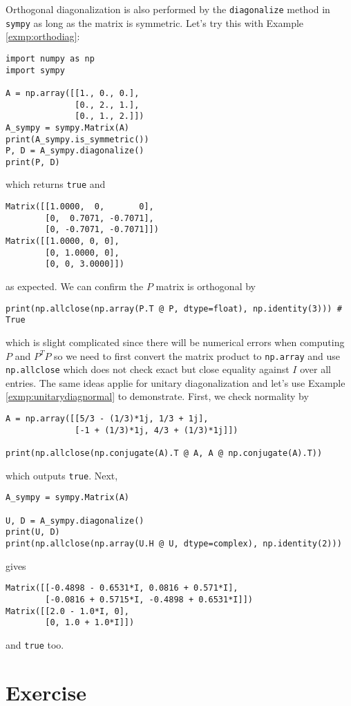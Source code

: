 Orthogonal diagonalization is also performed by the \verb|diagonalize| method in \texttt{sympy} as long as the matrix is symmetric. Let's try this with Example \ref{exmp:orthodiag}:
\begin{lstlisting}
import numpy as np
import sympy

A = np.array([[1., 0., 0.],
              [0., 2., 1.],
              [0., 1., 2.]])
A_sympy = sympy.Matrix(A)
print(A_sympy.is_symmetric())
P, D = A_sympy.diagonalize()
print(P, D)    
\end{lstlisting}
which returns \verb|true| and
\begin{lstlisting}
Matrix([[1.0000,  0,       0], 
        [0,  0.7071, -0.7071], 
        [0, -0.7071, -0.7071]])
Matrix([[1.0000, 0, 0], 
        [0, 1.0000, 0], 
        [0, 0, 3.0000]])    
\end{lstlisting}
as expected. We can confirm the $P$ matrix is orthogonal by
\begin{lstlisting}
print(np.allclose(np.array(P.T @ P, dtype=float), np.identity(3))) # True
\end{lstlisting}
which is slight complicated since there will be numerical errors when computing $P$ and $P^T P$ so we need to first convert the matrix product to \verb|np.array| and use \verb|np.allclose| which does not check exact but close equality against $I$ over all entries. The same ideas applie for unitary diagonalization and let's use Example \ref{exmp:unitarydiagnormal} to demonstrate. First, we check normality by 
\begin{lstlisting}
A = np.array([[5/3 - (1/3)*1j, 1/3 + 1j],
              [-1 + (1/3)*1j, 4/3 + (1/3)*1j]])

print(np.allclose(np.conjugate(A).T @ A, A @ np.conjugate(A).T))
\end{lstlisting}
which outputs \verb|true|. Next,
\begin{lstlisting}
A_sympy = sympy.Matrix(A)

U, D = A_sympy.diagonalize()
print(U, D)
print(np.allclose(np.array(U.H @ U, dtype=complex), np.identity(2)))   
\end{lstlisting}
gives
\begin{lstlisting}
Matrix([[-0.4898 - 0.6531*I, 0.0816 + 0.571*I], 
        [-0.0816 + 0.5715*I, -0.4898 + 0.6531*I]]) 
Matrix([[2.0 - 1.0*I, 0], 
        [0, 1.0 + 1.0*I]])  
\end{lstlisting}
and \verb|true| too.

\section{Exercise}

